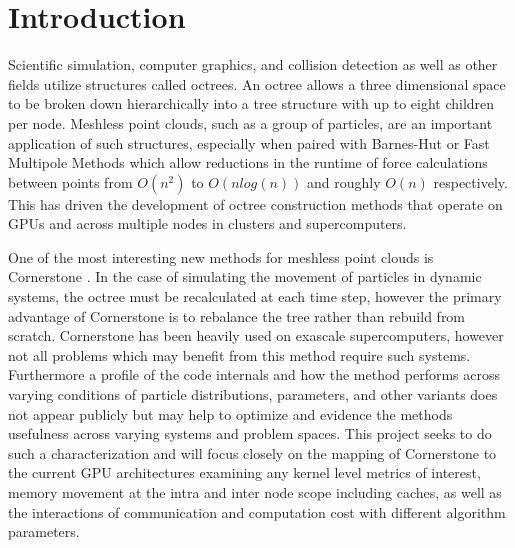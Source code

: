 \section{Introduction}
\label{sec:introduction}

Scientific simulation, computer graphics, and collision detection as well as other fields utilize structures called octrees. An octree allows a three dimensional space to be broken down hierarchically into a tree structure with up to eight children per node. Meshless point clouds, such as a group of particles, are an important application of such structures, especially when paired with Barnes-Hut or Fast Multipole Methods which allow reductions in the runtime of force calculations between points from $O(n^2)$ to $O(nlog(n))$ and roughly $O(n)$ respectively. This has driven the development of octree construction methods that operate on GPUs and across multiple nodes in clusters and supercomputers. 

One of the most interesting new methods for meshless point clouds is Cornerstone \cite{cornerstone}. In the case of simulating the movement of particles in dynamic systems, the octree must be recalculated at each time step, however the primary advantage of Cornerstone is to rebalance the tree rather than rebuild from scratch. Cornerstone has been heavily used on exascale supercomputers, however not all problems which may benefit from this method require such systems. Furthermore a profile of the code internals and how the method performs across varying conditions of particle distributions, parameters, and other variants does not appear publicly but may help to optimize and evidence the methods usefulness across varying systems and problem spaces. This project seeks to do such a characterization and will focus closely on the mapping of Cornerstone to the current GPU architectures examining any kernel level metrics of interest, memory movement at the intra and inter node scope including caches, as well as the interactions of communication and computation cost with different algorithm parameters.

